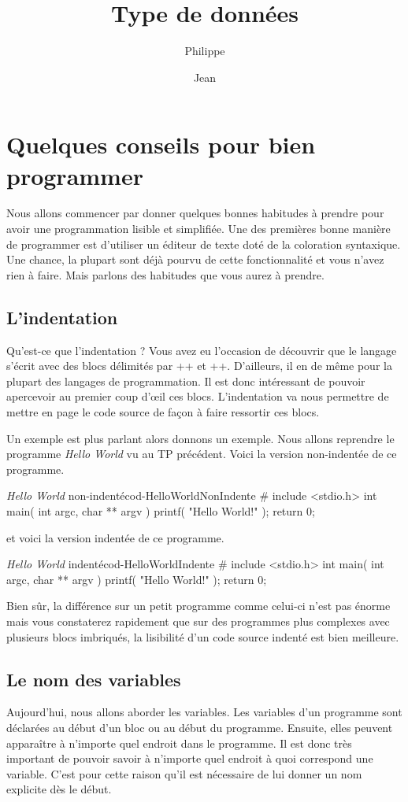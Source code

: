 \documentclass[a4paper]{article}
\title{Type de données}
\author{Philippe \Nom{Rinaudo}\and{}Jean \Nom{Simard}}
\date{\Date[l]{06}{10}{2009}}
\begin{document}
	\maketitle
	\section{Quelques conseils pour bien programmer}
		Nous allons commencer par donner quelques bonnes habitudes à prendre pour avoir une programmation lisible et simplifiée.
		Une des premières bonne manière de programmer est d'utiliser un éditeur de texte doté de la coloration syntaxique.
		Une chance, la plupart sont déjà pourvu de cette fonctionnalité et vous n'avez rien à faire.
		Mais parlons des habitudes que vous aurez à prendre.
		\subsection{L'indentation}
			Qu'est-ce que l'indentation ?
			Vous avez eu l'occasion de découvrir que le langage  s'écrit avec des blocs délimités par \code+{+ et \code+}+.
			D'ailleurs, il en de même pour la plupart des langages de programmation.
			Il est donc intéressant de pouvoir apercevoir au premier coup d'œil ces blocs.
			L'indentation va nous permettre de mettre en page le code source de façon à faire ressortir ces blocs.

			Un exemple est plus parlant alors donnons un exemple.
			Nous allons reprendre le programme \emph{Hello World} vu au TP précédent.
			Voici la version non-indentée de ce programme.
			\begin{Code}{\emph{Hello World} non-indenté}{cod-HelloWorldNonIndente}
# include <stdio.h>
int main( int argc, char ** argv )
{
printf( "Hello World!\n" );
return 0;
}
			\end{Code}
			et voici la version indentée de ce programme.
			\begin{Code}{\emph{Hello World} indenté}{cod-HelloWorldIndente}
# include <stdio.h>
int main( int argc, char ** argv )
{
	printf( "Hello World!\n" );
	return 0;
}
			\end{Code}

			Bien sûr, la différence sur un petit programme comme celui-ci n'est pas énorme mais vous constaterez rapidement que sur des programmes plus complexes avec plusieurs blocs imbriqués, la lisibilité d'un code source indenté est bien meilleure.
		\subsection{Le nom des variables}
			Aujourd'hui, nous allons aborder les variables.
			Les variables d'un programme sont déclarées au début d'un bloc ou au début du programme.
			Ensuite, elles peuvent apparaître à n'importe quel endroit dans le programme.
			Il est donc très important de pouvoir savoir à n'importe quel endroit à quoi correspond une variable.
			C'est pour cette raison qu'il est nécessaire de lui donner un nom explicite dès le début.
\end{document}
